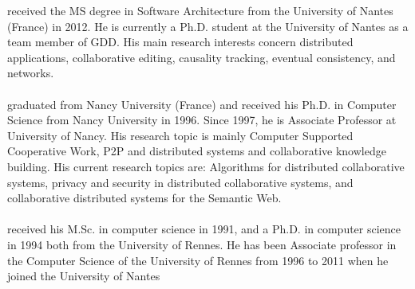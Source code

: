 
received the MS degree in Software Architecture from the University of Nantes
(France) in 2012. He is currently a Ph.D. student at the University of Nantes as
a team member of GDD. His main research interests concern distributed
applications, collaborative editing, causality tracking,  eventual
consistency, and networks.
\ \\ \ \\
graduated from Nancy University (France) and received his Ph.D. in Computer
Science from Nancy University in 1996. Since 1997, he is Associate Professor at
University of Nancy. His research topic is mainly Computer Supported Cooperative
Work, P2P and distributed systems and collaborative knowledge building. His
current research topics are: Algorithms for distributed collaborative systems,
privacy and security in distributed collaborative systems, and collaborative
distributed systems for the Semantic Web.
\\ \ \\
 received his M.Sc.  in computer science in
1991, and a Ph.D. in computer science in 1994 both from the University of
Rennes. He has been Associate professor in the Computer Science of the
University of Rennes from 1996 to 2011 when he joined the University of Nantes
